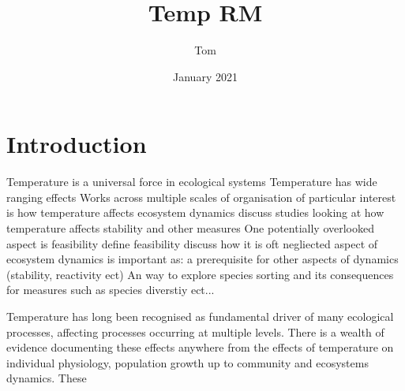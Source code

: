 \documentclass{article}
\title{Temp RM}
\author{Tom}
\date{January 2021}
\begin{document}
\maketitle

\section{Introduction}
\begin{outline}
    \1 Temperature is a universal force in ecological systems
        \2 Temperature has wide ranging effects
        \2 Works across multiple scales of organisation
    \1 of particular interest is how temperature affects ecosystem dynamics 
        \2 discuss studies looking at how temperature affects stability and other measures
    \1 One potentially overlooked aspect is feasibility 
        \2 define feasibility
        \2 discuss how it is oft negliected aspect of ecosystem dynamics
        \2 is important as:
            \3 a prerequisite for other aspects of dynamics (stability, reactivity ect) 
            \3 An way to explore species sorting and its consequences for measures such as species diverstiy ect...  
\end{outline}

Temperature has long been recognised as fundamental driver of many ecological processes, affecting processes occurring at multiple levels. There is a wealth of evidence documenting these effects anywhere from the effects of temperature on individual physiology,  population growth up to community and ecosystems dynamics. These 
\end{document}

